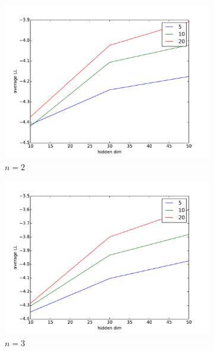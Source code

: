 \documentclass[psamsfonts]{amsart}
\theoremstyle{definition}
\theoremstyle{remark}
\numberwithin{equation}{section}
\begin{document}
\begin{figure}
	\begin{subfigure}[b]{0.3\textwidth}
		\includegraphics[width=\textwidth]{code/hw1_train_n2.pdf}
		\caption{$n=2$}
	\end{subfigure}
	\begin{subfigure}[b]{0.3\textwidth}
		\includegraphics[width=\textwidth]{code/hw1_train_n3.pdf}
		\caption{$n=3$}
	\end{subfigure}
	\begin{subfigure}[b]{0.3\textwidth}

\end{subfigure}
\end{figure}
\end{document}
